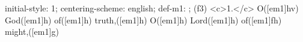 initial-style: 1;
centering-scheme: english;
def-m1: \grealign;
(f3) <c>1.</c> O([em1]hv) God([em1]h) of([em1]h) truth,([em1]h) O([em1]h) Lord([em1]h) of([em1]fh) might,([em1]g)